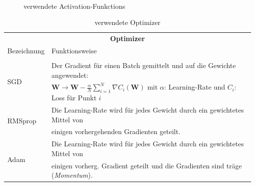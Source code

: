 \begin{figure}
	 \\  
	\caption{verwendete Activation-Funkctions}
	\label{Aktivierungsfunktionen}
\end{figure}
\begin{table}
	\centering
	\begin{tabular}{ll}
		\multicolumn{2}{c}{\textbf{Optimizer}} \\
		Bezeichnung & Funktionsweise \\
		\hline\\[-10pt]
		\multirow{2}{*}{SGD}& Der Gradient für einen Batch gemittelt und auf die Gewichte angewendet:\\
		&  $\textbf{W} \rightarrow \textbf{W} - \frac{\alpha}{N}\sum_{i=1}^{N}\nabla C_i(\textbf{W})$ mit $\alpha$: Learning-Rate und $C_i$: Loss für Punkt $i$ \\[5pt]
		\multirow{2}{*}{RMSprop \cite{RMSprop}} & Die Learning-Rate wird für jedes Gewicht durch ein gewichtetes Mittel von \\
		& einigen vorhergehenden Gradienten geteilt. \\[5pt]
		\multirow{2}{*}{Adam \cite{Adam}} & Die Learning-Rate wird für jedes Gewicht durch ein gewichtetes Mittel von \\
		&einigen vorherg. Gradient geteilt und die Gradienten sind träge (\textit{Momentum}). 
	\end{tabular}
	\caption{verwendete Optimizer}
	\label{optimizer}
\end{table}

